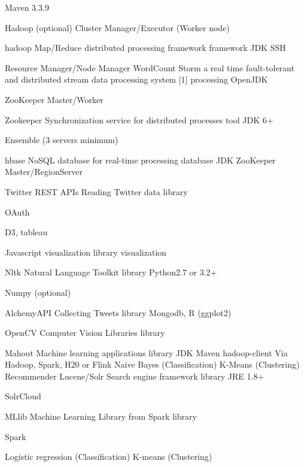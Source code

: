 \documentclass[9pt,twocolumn,twoside]{styles/osajnl}
\begin{document}
Maven 3.3.9

	Hadoop (optional)
	Cluster Manager/Executor (Worker node)
	

	hadoop
	Map/Reduce distributed processing framework
	framework
	JDK
SSH
	

	Resource Manager/Node Manager
	WordCount
	Storm
	a real time fault-tolerant and distributed stream data processing system [1]
	processing
	OpenJDK


	ZooKeeper
	Master/Worker
	

	Zookeeper
	Synchronization service for distributed processes
	tool
	JDK 6+
	

	Ensemble (3 servers minimum)

	

	hbase
	NoSQL database for real-time processing
	database
	JDK
	ZooKeeper
	Master/RegionServer
	

	Twitter REST APIs
	Reading Twitter data
	library
	

	OAuth
	

	

	D3, tableau

	Javascript visualization library
	visualization
	

	

	

	

	Nltk
	Natural Language Toolkit
	library
	Python2.7 or 3.2+

	Numpy (optional)
	

	

	AlchemyAPI
	Collecting Tweets
	library
	Mongodb, R (ggplot2)
	

	

	

	OpenCV
	Computer Vision Libraries
	library
	

	

	

	

	Mahout
	Machine learning applications
	library
	JDK
Maven
	hadoop-client
	Via Hadoop, Spark, H20 or Flink
	Naive Bayes (Classification)
K-Means (Clustering)
Recommender
	Lucene/Solr
	Search engine framework
	library
	JRE 1.8+
	

	SolrCloud
	

	MLlib
	Machine Learning Library from Spark
	library
	

	Spark
	

	Logistic regression (Classification)
K-means (Clustering)
	

	
\end{document}
